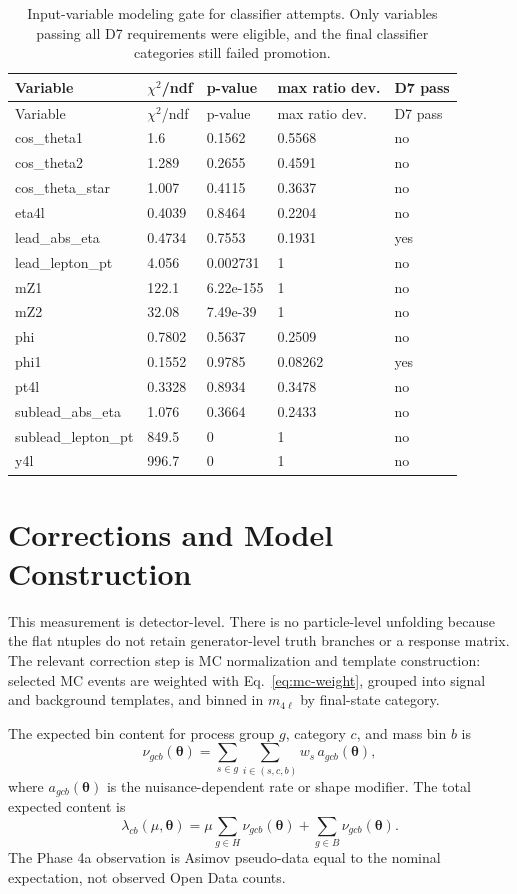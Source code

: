 \documentclass[11pt]{article}
\begin{document}
\begin{longtable}{lllll}
\caption{Input-variable modeling gate for classifier attempts. Only variables passing all D7 requirements were eligible, and the final classifier categories still failed promotion.}\label{tab:input-gate}\\
\toprule
Variable & $\chi^2$/ndf & p-value & max ratio dev. & D7 pass \\ 
\midrule
\endfirsthead
\toprule
Variable & $\chi^2$/ndf & p-value & max ratio dev. & D7 pass \\ 
\midrule
\endhead
cos\_theta1 & 1.6 & 0.1562 & 0.5568 & no \\
cos\_theta2 & 1.289 & 0.2655 & 0.4591 & no \\
cos\_theta\_star & 1.007 & 0.4115 & 0.3637 & no \\
eta4l & 0.4039 & 0.8464 & 0.2204 & no \\
lead\_abs\_eta & 0.4734 & 0.7553 & 0.1931 & yes \\
lead\_lepton\_pt & 4.056 & 0.002731 & 1 & no \\
mZ1 & 122.1 & 6.22e-155 & 1 & no \\
mZ2 & 32.08 & 7.49e-39 & 1 & no \\
phi & 0.7802 & 0.5637 & 0.2509 & no \\
phi1 & 0.1552 & 0.9785 & 0.08262 & yes \\
pt4l & 0.3328 & 0.8934 & 0.3478 & no \\
sublead\_abs\_eta & 1.076 & 0.3664 & 0.2433 & no \\
sublead\_lepton\_pt & 849.5 & 0 & 1 & no \\
y4l & 996.7 & 0 & 1 & no \\
\bottomrule
\end{longtable}


\section{Corrections and Model Construction}
This measurement is detector-level. There is no particle-level unfolding because the flat ntuples do not retain generator-level truth branches or a response matrix. The relevant correction step is MC normalization and template construction: selected MC events are weighted with Eq.~\ref{eq:mc-weight}, grouped into signal and background templates, and binned in $m_{4\ell}$ by final-state category.

The expected bin content for process group $g$, category $c$, and mass bin $b$ is
\begin{equation}
 \nu_{gcb}(\boldsymbol{\theta}) = \sum_{s\in g}\sum_{i\in(s,c,b)} w_s\,a_{gcb}(\boldsymbol{\theta}),
 \label{eq:template-content}
\end{equation}
where $a_{gcb}(\boldsymbol{\theta})$ is the nuisance-dependent rate or shape modifier. The total expected content is
\begin{equation}
 \lambda_{cb}(\mu,\boldsymbol{\theta}) = \mu\sum_{g\in H}\nu_{gcb}(\boldsymbol{\theta}) + \sum_{g\in B}\nu_{gcb}(\boldsymbol{\theta}).
 \label{eq:expected-content}
\end{equation}
The Phase 4a observation is Asimov pseudo-data equal to the nominal expectation, not observed Open Data counts.
\end{document}
